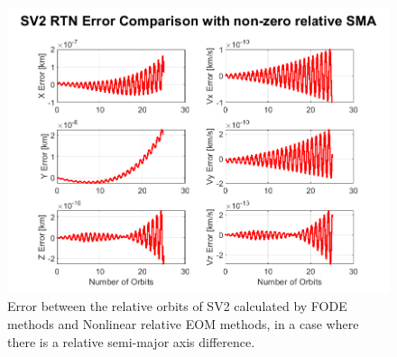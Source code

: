 \begin{figure}
    \centering
    \includegraphics[width=0.7\linewidth]{sim/figures/SV2_error_in_rel_methods_nonzero_a.png}
    \caption{Error between the relative orbits of SV2 calculated by FODE methods and Nonlinear relative EOM methods, in a case where there is a relative semi-major axis difference.}
    \label{fig:error_in_SV2_rel_nonzero_a}
\end{figure}

